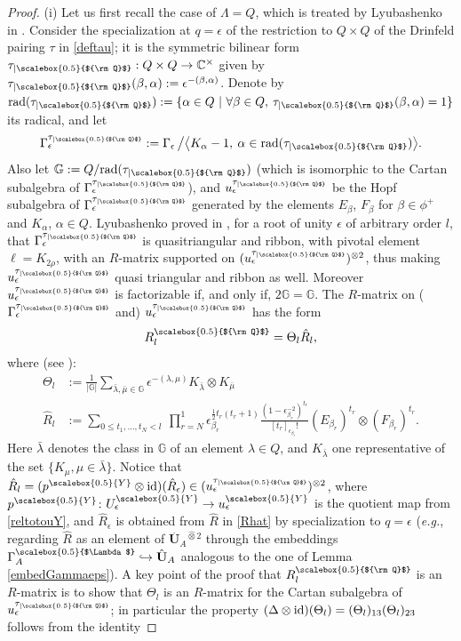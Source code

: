 \documentclass[11pt]{amsart}
\newcommand{\e}{\epsilon}
\newcommand{\mc}{\mathbb{C}}
\newcommand{\Q}{{\scalebox{0.5}{${\rm Q}$}}}
\newcommand{\Y}{{\scalebox{0.5}{Y}}}
\newcommand{\Lam}{{\scalebox{0.5}{$\Lambda$}}}
\begin{document}
\begin{proof}
(i) Let us first recall the case of $\Lambda=Q$, which is treated by Lyubashenko in \cite{Lyub95}. Consider the specialization at $q=\e$ of the restriction to $Q\times Q$ of the Drinfeld pairing $\tau$ in \eqref{deftau}; it is the symmetric bilinear form $\tau_{\vert \Q}:Q \times Q \to \mc^\times$ given by $\tau_{\vert \Q}(\beta,\alpha) := \e^{-(\beta, \alpha)}$. Denote by ${\rm rad}(\tau_{\vert \Q}) := \{\alpha\in Q\ \vert\  \forall \beta\in Q, \: \tau_{\vert \Q}(\beta,\alpha)=1\}$ its radical, and let
\[ \Gamma_\e^{\tau_{\vert \Q}} := \Gamma_\e \,\big/ \bigl\langle K_\alpha-1, \: \alpha\in {\rm rad}(\tau_{\vert \Q}) \bigr\rangle. \]
Also let $\mathbb{G}:= Q/{\rm rad}(\tau_{\vert \Q})$ (which is isomorphic to the Cartan subalgebra of $\Gamma_\e^{\tau_{\vert \Q}}$), and $u_\e^{\tau_{\vert \Q}}$ be the Hopf subalgebra of $\Gamma_\e^{\tau_{\vert \Q}}$ generated by the elements $E_{\beta}$, $F_{\beta}$ for $\beta\in \phi^+$ and $K_\alpha$, $\alpha\in Q$. Lyubashenko proved in \cite[App.\,A.1--A.3]{Lyub95}, for a root of unity $\e$ of arbitrary order $l$, that $\Gamma_\e^{\tau_{\vert \Q}}$ is quasitriangular and ribbon, with pivotal element $\ell=K_{2\rho}$, with an $R$-matrix supported on $(u_\e^{\tau_{\vert \Q}})^{\otimes 2}$, thus making $u_\e^{\tau_{\vert \Q}}$ quasi triangular and ribbon as well. Moreover $u_\e^{\tau_{\vert \Q}}$ is factorizable if, and only if, $2\mathbb{G} = \mathbb{G}$. The $R$-matrix on ($\Gamma_\e^{\tau_{\vert \Q}}$ and) $u_\e^{\tau_{\vert \Q}}$ has the form %
\begin{equation}\label{Rmatl}
R_l^\Q = \Theta_l \hat{R}_l,
\end{equation}
where (see \cite[Thm.\,A.1.6 and eq.\,(A.2.1)]{Lyub95}):%
\begin{align*}
\Theta_l & := \frac{1}{\vert \mathbb{G} \vert}\sum_{\bar{\lambda},\bar{\mu}\in \mathbb{G}} \e^{-(\lambda,\mu)} K_{\bar{\lambda}} \otimes K_{\bar{\mu}}\\
\hat{R}_l & := \sum_{0\leq t_1,\ldots,t_N<l} \ \prod_{r=N}^1 \e_{\beta_r}^{\frac{1}{2}t_r(t_r+1)} \frac{(1-\e_{\beta_r}^{-2})^{t_r}}{[t_r]_{\e_{\beta_r}} !} (E_{\beta_r})^{t_r} \otimes (F_{\beta_r})^{t_r}.
\end{align*}
Here $\bar{\lambda}$ denotes the class in $\mathbb{G}$ of an element $\lambda\in Q$, and $K_{\bar{\lambda}}$ one representative of the set $\{K_\mu, \mu\in \bar{\lambda}\}$. Notice that $\hat{R}_l=(p^\Y\otimes {\rm id})(\hat{R}_\e)\in (u_\e^{\tau_{\vert \Q}})^{\otimes 2}$, where $p^\Y\colon U_\e^\Y \to u_\e^\Y$ is the quotient map from \eqref{reltotouY}, and $\hat{R}_\e$ is obtained from $\hat{R}$ in \eqref{Rhat} by specialization to $q=\e$ ({\it e.g.}, regarding $\hat{R}$ as an element of $\stackrel{.}{\mathbf{U}}_A\!\!\!{}^{\hat{\otimes} 2}$ through the embeddings $\Gamma_A^\Lam\hookrightarrow \hat{{\mathbf{U}}}_A$ analogous to the one of Lemma \ref{embedGammaeps}). A key point of the proof that $R_l^\Q$ is an $R$-matrix is to show that $\Theta_l$ is an $R$-matrix for the Cartan subalgebra of $u_\e^{\tau_{\vert \Q}}$; in particular the property $(\Delta\otimes {\rm id})(\Theta_l) = (\Theta_l)_{13}(\Theta_l)_{23}$ follows from the identity

\end{proof}
\end{document}

